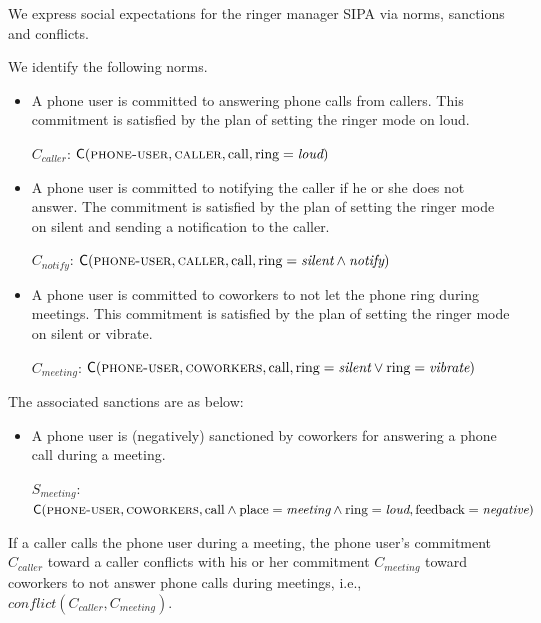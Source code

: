 We express social expectations for the ringer manager SIPA via norms,
sanctions and conflicts.
\begin{description}[leftmargin=1em]
\item[Norms.] We identify the following norms.
  \begin{itemize}[leftmargin=1em]
  \item A phone user is committed to answering phone calls from
  callers. This commitment is satisfied by the plan of setting the 
  ringer mode on loud.

  $C_{caller}$: $\mathsf{C}(\textsc{phone-user},\textsc{caller}, \text{call}, \text{ring}=\textit{loud})$

  \item A phone user is committed to notifying the caller if he or she does
  not answer. The commitment is satisfied by the plan of setting the
  ringer mode on silent and sending a notification to the caller.
  
  $C_{notify}$: $\mathsf{C}(\textsc{phone-user},\textsc{caller}, \text{call},\\ 
  \text{ring}= \textit{silent}   \land \textit{notify})$
    
  \item A phone user is committed to coworkers to not let the phone ring 
  during meetings.
  This commitment is satisfied by the plan of setting the ringer mode on 
  silent or vibrate. 

  $C_{meeting}$: $\mathsf{C}(\textsc{phone-user},\textsc{coworkers}, \text{call},\\ 
  \text{ring}= \textit{silent} \lor \text{ring} = \textit{vibrate})$
  \end{itemize}
  
\item[Sanctions.] The associated sanctions are as below: 
  \begin{itemize}[leftmargin=1em]
  \item A phone user is (negatively) sanctioned by coworkers for 
  answering a phone call during a meeting. 
  
    $S_{meeting}$: $\mathsf{C}(\textsc{phone-user},\textsc{coworkers}, \text{call} \\
    \land \text{place}=\textit{meeting} \land \text{ring}=\textit{loud}, \text{feedback}=\textit{negative})$
  \end{itemize}
  
  \item[Conflicts.] If a caller calls the phone user during a meeting, the phone 
  user's commitment $C_{caller}$ toward a caller conflicts with his or her 
  commitment $C_{meeting}$ toward coworkers to not answer phone calls 
  during meetings, i.e., \\$\mathit{conflict}(C_{caller}, C_{meeting})$.
    
\end{description}

